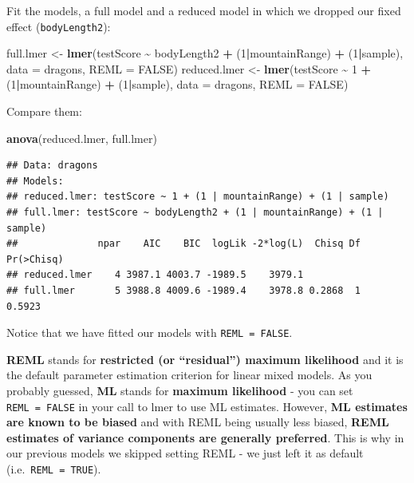 \documentclass[
]{article}
\newenvironment{Shaded}{\begin{snugshade}}{\end{snugshade}}
\newcommand{\AttributeTok}[1]{\textcolor[rgb]{0.13,0.29,0.53}{#1}}
\newcommand{\ConstantTok}[1]{\textcolor[rgb]{0.56,0.35,0.01}{#1}}
\newcommand{\DecValTok}[1]{\textcolor[rgb]{0.00,0.00,0.81}{#1}}
\newcommand{\FunctionTok}[1]{\textcolor[rgb]{0.13,0.29,0.53}{\textbf{#1}}}
\newcommand{\NormalTok}[1]{#1}
\newcommand{\OtherTok}[1]{\textcolor[rgb]{0.56,0.35,0.01}{#1}}
\newcommand{\SpecialCharTok}[1]{\textcolor[rgb]{0.81,0.36,0.00}{\textbf{#1}}}
\begin{document}
Fit the models, a full model and a reduced model in which we dropped our
fixed effect (\texttt{bodyLength2}):

\begin{Shaded}
\begin{Highlighting}[]
\NormalTok{full.lmer }\OtherTok{\textless{}{-}} \FunctionTok{lmer}\NormalTok{(testScore }\SpecialCharTok{\textasciitilde{}}\NormalTok{ bodyLength2 }\SpecialCharTok{+}\NormalTok{ (}\DecValTok{1}\SpecialCharTok{|}\NormalTok{mountainRange) }\SpecialCharTok{+}\NormalTok{ (}\DecValTok{1}\SpecialCharTok{|}\NormalTok{sample), }
                  \AttributeTok{data =}\NormalTok{ dragons, }\AttributeTok{REML =} \ConstantTok{FALSE}\NormalTok{)}
\NormalTok{reduced.lmer }\OtherTok{\textless{}{-}} \FunctionTok{lmer}\NormalTok{(testScore }\SpecialCharTok{\textasciitilde{}} \DecValTok{1} \SpecialCharTok{+}\NormalTok{ (}\DecValTok{1}\SpecialCharTok{|}\NormalTok{mountainRange) }\SpecialCharTok{+}\NormalTok{ (}\DecValTok{1}\SpecialCharTok{|}\NormalTok{sample), }
                         \AttributeTok{data =}\NormalTok{ dragons, }\AttributeTok{REML =} \ConstantTok{FALSE}\NormalTok{)}
\end{Highlighting}
\end{Shaded}

Compare them:

\begin{Shaded}
\begin{Highlighting}[]
\FunctionTok{anova}\NormalTok{(reduced.lmer, full.lmer)}
\end{Highlighting}
\end{Shaded}

\begin{verbatim}
## Data: dragons
## Models:
## reduced.lmer: testScore ~ 1 + (1 | mountainRange) + (1 | sample)
## full.lmer: testScore ~ bodyLength2 + (1 | mountainRange) + (1 | sample)
##              npar    AIC    BIC  logLik -2*log(L)  Chisq Df Pr(>Chisq)
## reduced.lmer    4 3987.1 4003.7 -1989.5    3979.1                     
## full.lmer       5 3988.8 4009.6 -1989.4    3978.8 0.2868  1     0.5923
\end{verbatim}

Notice that we have fitted our models with \texttt{REML\ =\ FALSE}.

\textbf{REML} stands for \textbf{restricted (or ``residual'') maximum
likelihood} and it is the default parameter estimation criterion for
linear mixed models. As you probably guessed, \textbf{ML} stands for
\textbf{maximum likelihood} - you can set \texttt{REML\ =\ FALSE} in
your call to lmer to use ML estimates. However, \textbf{ML estimates are
known to be biased} and with REML being usually less biased,
\textbf{REML estimates of variance components are generally preferred}.
This is why in our previous models we skipped setting REML - we just
left it as default (i.e.~\texttt{REML\ =\ TRUE}).
\end{document}
